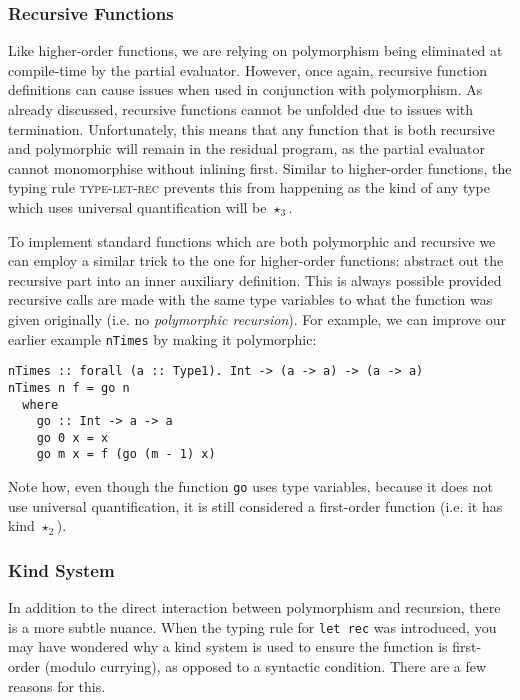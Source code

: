 \documentclass[runningheads]{llncs}
\begin{document}
\subsubsection{Recursive Functions}

Like higher-order functions, we are relying on polymorphism being eliminated at compile-time by the partial evaluator. However, once again, recursive function definitions can cause issues when used in conjunction with polymorphism. As already discussed, recursive functions cannot be unfolded due to issues with termination. Unfortunately, this means that any function that is both recursive and polymorphic will remain in the residual program, as the partial evaluator cannot monomorphise without inlining first. Similar to higher-order functions, the typing rule \textsc{type-let-rec} prevents this from happening as the kind of any type which uses universal quantification will be $\star_3$.

To implement standard functions which are both polymorphic and recursive we can employ a similar trick to the one for higher-order functions: abstract out the recursive part into an inner auxiliary definition. This is always possible provided recursive calls are made with the same type variables to what the function was given originally (i.e. no \textit{polymorphic recursion}). For example, we can improve our earlier example \texttt{nTimes} by making it polymorphic:

\begin{verbatim}
nTimes :: forall (a :: Type1). Int -> (a -> a) -> (a -> a)
nTimes n f = go n
  where
    go :: Int -> a -> a
    go 0 x = x
    go m x = f (go (m - 1) x)
\end{verbatim}

Note how, even though the function \texttt{go} uses type variables, because it does not use universal quantification, it is still considered a first-order function (i.e. it has kind $\star_2$).

\subsubsection{Kind System} \label{sec:kind-system}

In addition to the direct interaction between polymorphism and recursion, there is a more subtle nuance. When the typing rule for \texttt{let rec} was introduced, you may have wondered why a kind system is used to ensure the function is first-order (modulo currying), as opposed to a syntactic condition. There are a few reasons for this.
\end{document}
